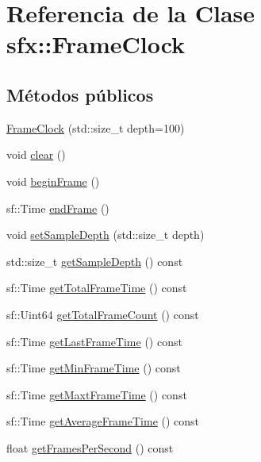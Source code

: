 \hypertarget{classsfx_1_1FrameClock}{}\section{Referencia de la Clase sfx\+:\+:Frame\+Clock}
\label{classsfx_1_1FrameClock}
\subsection*{Métodos públicos}
\begin{DoxyCompactItemize}
\item 
\hyperlink{classsfx_1_1FrameClock_a3a8d349a05fd1660e89aebdc10e9ce8e}{Frame\+Clock} (std\+::size\+\_\+t depth=100)
\item 
void \hyperlink{classsfx_1_1FrameClock_a5460df0fca7d2152c9495037ac3be951}{clear} ()
\item 
void \hyperlink{classsfx_1_1FrameClock_abbbf7925b85457baa38a5e58f4c59700}{begin\+Frame} ()
\item 
sf\+::\+Time \hyperlink{classsfx_1_1FrameClock_adc6c03afb4129e937135cc2c8c7efc85}{end\+Frame} ()
\item 
void \hyperlink{classsfx_1_1FrameClock_a2794e0ce9787e5ff728213990f25980b}{set\+Sample\+Depth} (std\+::size\+\_\+t depth)
\item 
std\+::size\+\_\+t \hyperlink{classsfx_1_1FrameClock_a4cbdd6b8e22258ef512484711cd815b6}{get\+Sample\+Depth} () const 
\item 
sf\+::\+Time \hyperlink{classsfx_1_1FrameClock_aae9f3f23f938cbb979f1b2192af12eae}{get\+Total\+Frame\+Time} () const 
\item 
sf\+::\+Uint64 \hyperlink{classsfx_1_1FrameClock_a27e3203a236bf84053702e878b62a3bd}{get\+Total\+Frame\+Count} () const 
\item 
sf\+::\+Time \hyperlink{classsfx_1_1FrameClock_a7ffe2e6262e3d47bcb80a9e56f57e6a7}{get\+Last\+Frame\+Time} () const 
\item 
sf\+::\+Time \hyperlink{classsfx_1_1FrameClock_ac34015580c6bbae9f4419027955a042a}{get\+Min\+Frame\+Time} () const 
\item 
sf\+::\+Time \hyperlink{classsfx_1_1FrameClock_a208707ee3920b0f0c8edd18edce7c663}{get\+Maxt\+Frame\+Time} () const 
\item 
sf\+::\+Time \hyperlink{classsfx_1_1FrameClock_aa7bac1e9ab95ea0409344f16d59daf07}{get\+Average\+Frame\+Time} () const 
\item 
float \hyperlink{classsfx_1_1FrameClock_a8b19e892d8ac098d7a7d3fdb1e4df4af}{get\+Frames\+Per\+Second} () const 

\end{DoxyCompactItemize}
